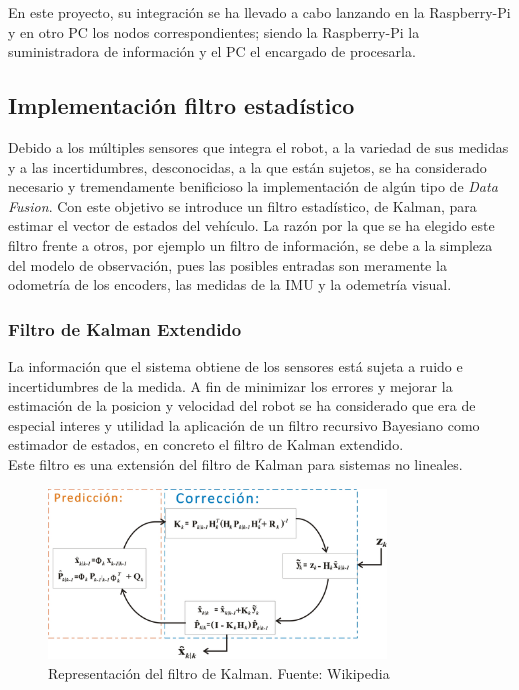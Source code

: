 En este proyecto, su integración se ha llevado a cabo lanzando en la Raspberry-Pi y en otro PC los nodos correspondientes; siendo la Raspberry-Pi la 
suministradora de información y el PC el encargado de procesarla.

\subsection{Implementación filtro estadístico}
Debido a los múltiples sensores que integra el robot, a la variedad de sus medidas y a las incertidumbres, desconocidas, a la que están sujetos, se ha considerado necesario y tremendamente benificioso la implementación de algún tipo de \textit{Data Fusion}. Con este objetivo se introduce un filtro estadístico, de Kalman, para estimar el vector de estados del vehículo. La razón por la que se ha elegido este filtro frente a otros, por ejemplo un filtro de información, se debe a la simpleza del modelo de observación, pues las posibles entradas son meramente la odometría de los encoders, las medidas de la IMU y la odemetría visual.

\subsubsection{Filtro de Kalman Extendido}
La información que el sistema obtiene de los sensores está sujeta a ruido e incertidumbres de la medida. A fin de minimizar los errores y mejorar la estimación de la posicion y velocidad del robot se ha 
considerado que era de especial interes y utilidad la aplicación de un filtro recursivo Bayesiano como estimador de estados, en concreto el filtro de Kalman extendido. \\
Este filtro es una extensión del filtro de Kalman para sistemas no lineales.
\begin{figure}
    \centering
    \includegraphics[width=0.8\textwidth]{images/kalman.jpg}
    \caption{Representación del filtro de Kalman. Fuente: Wikipedia}
\end{figure}

